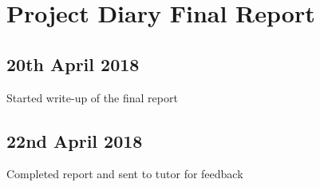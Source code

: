 \section{Project Diary Final Report}

\subsection{20th April 2018}
Started write-up of the final report

\subsection{22nd April 2018}
Completed report and sent to tutor for feedback
